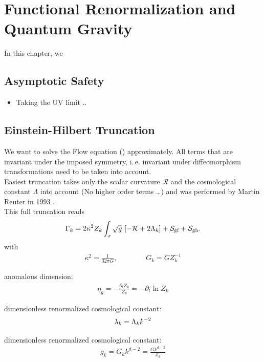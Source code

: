 \chapter{Functional Renormalization and Quantum Gravity}\label{chap:EHT}
In this chapter, we 
\section{Asymptotic Safety}
\begin{itemize}
	\item Taking the UV limit ..
\end{itemize}
\section{Einstein-Hilbert Truncation}

We want to solve the Flow equation ()%
approximately. All terms that are invariant under the imposed symmetry, i.\,e. invariant under diffeomorphism transformations need to be taken into account. \\

Easiest truncation takes only the scalar curvature $\mathcal{R}$ and the cosmological constant $\Lambda$ into account (No higher order terms \dots) and was performed by Martin Reuter in 1993 \cite{ReuterSaueressig2002}. \\


This full truncation reads
\begin{align}
	\Gamma_{k} = 2\kappa^2Z_k \int_x \sqrt{g} \ [-\mathcal{R} + 2\Lambda_k] + \mathcal{S}_{\text{gf}} + \mathcal{S}_{\text{gh}}.
\label{eqn:QGflow}
\end{align}
with 
\begin{align}
	\kappa^2 = \frac{1}{32\pi G}, \qquad\qquad G_k = GZ^{-1}_k
\end{align}



anomalous dimension: 
\begin{align*}
	\eta_g = -\frac{\partial_t Z_k}{Z_k} = -\partial_t \ln Z_k
\end{align*}

dimensionless renormalized cosmological constant:
\begin{align*}
	\lambda_k = \Lambda_k k^{-2}
\end{align*}

dimensionless renormalized cosmological constant:
\begin{align*}
	g_k = G_k k^{d-2} = \frac{Gk^{d-2}}{Z_k}
\end{align*}

